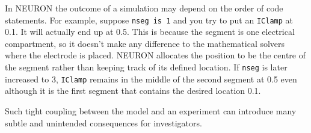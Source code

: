 \documentclass[10pt]{article}
\begin{document}
In NEURON the outcome of a simulation may depend on the order of code statements. For example, suppose {\tt nseg is 1} and you try to put an {\tt IClamp} at 0.1. It will actually end up at 0.5. This is because the segment is one electrical compartment, so it doesn't make any difference to the mathematical solvers where the electrode is placed. NEURON allocates the position to be the centre of the segment rather than keeping track of its defined location. If {\tt nseg} is later increased to 3, {\tt IClamp} remains in the middle of the second segment at 0.5 even although it is the first segment that contains the desired location 0.1.

Such tight coupling between the model and an experiment can introduce many subtle and unintended consequences for investigators.
\end{document}
